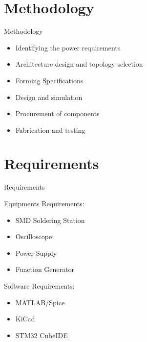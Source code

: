 \documentclass[aspectratio=169]{beamer}
\begin{document}
	\section{Methodology}	
	\begin{frame}{Methodology}
		\begin{itemize}
			
			\item Identifying the power requirements
		\item Architecture design and topology selection
			\item Forming Specifications
			
			\item Design and simulation
			\item Procurement of components
			\item Fabrication and testing
			
		\end{itemize} 
		
	\end{frame}
	
	
	\section{Requirements}
	\begin{frame}{Requirements}
		\begin{minipage}{0.5\textwidth}
			Equipments Requirements:
			\begin{itemize}
				
				\item SMD Soldering Station
				\item Oscilloscope
				\item Power Supply
				\item Function Generator
			\end{itemize} 
		\end{minipage}
		\begin{minipage}{0.3\textwidth}
			Software Requirements:
			\begin{itemize}
				
				\item MATLAB/Spice
				\item KiCad
				\item STM32 CubeIDE
				
			\end{itemize} 
			
		\end{minipage}
	\end{frame}
	
\end{document}
